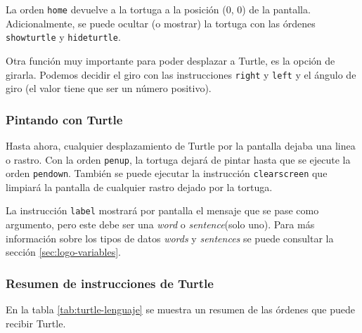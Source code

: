 La orden \texttt{home} devuelve a la tortuga a la posición (0, 0) de la pantalla. Adicionalmente, se puede ocultar (o mostrar) la tortuga con las órdenes \texttt{showturtle} y \texttt{hideturtle}.

Otra función muy importante para poder desplazar a Turtle, es la opción de girarla. Podemos decidir el giro con las instrucciones \texttt{right} y \texttt{left} y el ángulo de giro (el valor tiene que ser un número positivo). 


\subsubsection*{Pintando con Turtle}

Hasta ahora, cualquier desplazamiento de Turtle por la pantalla dejaba una linea o rastro. Con la orden \texttt{penup}, la tortuga dejará de pintar hasta que se ejecute la orden \texttt{pendown}. También se puede ejecutar la instrucción \texttt{clearscreen} que limpiará la pantalla de cualquier rastro dejado por la tortuga.

La instrucción \texttt{label} mostrará por pantalla el mensaje que se pase como argumento, pero este debe ser una \emph{word} o \emph{sentence}(solo uno). Para más información sobre los tipos de datos \emph{words} y \emph{sentences} se puede consultar la sección \ref{sec:logo-variables}.

\subsubsection*{Resumen de instrucciones de Turtle}
 
 
En la tabla \ref{tab:turtle-lenguaje} se muestra un resumen de las órdenes que puede recibir Turtle.

